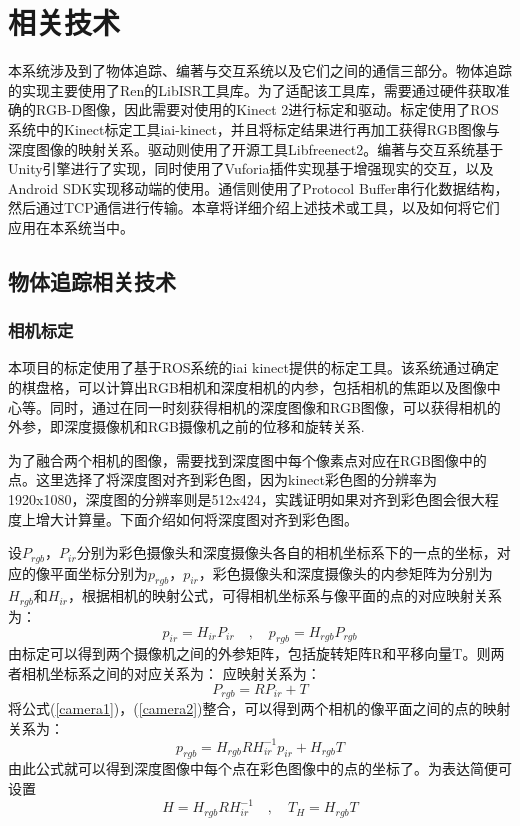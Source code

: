 \chapter{相关技术}
\label{chap:tech}

本系统涉及到了物体追踪、编著与交互系统以及它们之间的通信三部分。物体追踪的实现主要使用了Ren的LibISR工具库\cite{Ren_3DV_2014,star3d_iccv_2013}。为了适配该工具库，需要通过硬件获取准确的RGB-D图像，因此需要对使用的Kinect 2进行标定和驱动。标定使用了ROS系统中的Kinect标定工具iai-kinect\cite{iai_kinect2}，并且将标定结果进行再加工获得RGB图像与深度图像的映射关系。驱动则使用了开源工具Libfreenect2\cite{libfreenect2}。编著与交互系统基于Unity引擎\cite{Unity}进行了实现，同时使用了Vuforia插件\cite{Vuforia}实现基于增强现实的交互，以及Android SDK\cite{Android}实现移动端的使用。通信则使用了Protocol Buffer\cite{Protobuf, ProtobufNet}串行化数据结构，然后通过TCP通信进行传输。本章将详细介绍上述技术或工具，以及如何将它们应用在本系统当中。

\section{物体追踪相关技术}
\subsection{相机标定}
本项目的标定使用了基于ROS系统的iai kinect提供的标定工具。该系统通过确定的棋盘格，可以计算出RGB相机和深度相机的内参，包括相机的焦距以及图像中心等。同时，通过在同一时刻获得相机的深度图像和RGB图像，可以获得相机的外参，即深度摄像机和RGB摄像机之前的位移和旋转关系.

为了融合两个相机的图像，需要找到深度图中每个像素点对应在RGB图像中的点。这里选择了将深度图对齐到彩色图，因为kinect彩色图的分辨率为1920x1080，深度图的分辨率则是512x424，实践证明如果对齐到彩色图会很大程度上增大计算量。下面介绍如何将深度图对齐到彩色图。

设$P_{rgb}$，$P_{ir}$分别为彩色摄像头和深度摄像头各自的相机坐标系下的一点的坐标，对应的像平面坐标分别为$p_{rgb}$，$p_{ir}$，彩色摄像头和深度摄像头的内参矩阵为分别为$H_{rgb}$和$H_{ir}$，根据相机的映射公式，可得相机坐标系与像平面的点的对应映射关系为：
\begin{equation}
 p_{ir} = H_{ir}P_{ir} \quad\mathrm{,}\quad  p_{rgb} = H_{rgb}P_{rgb}\label{camera1}
\end{equation}
由标定可以得到两个摄像机之间的外参矩阵，包括旋转矩阵R和平移向量T。则两者相机坐标系之间的对应关系为：
应映射关系为：
\begin{equation}
 P_{rgb} = RP_{ir} + T \label{camera2}
\end{equation}
将公式(\ref{camera1})，(\ref{camera2})整合，可以得到两个相机的像平面之间的点的映射关系为：
\begin{equation}
 p_{rgb} = H_{rgb}RH_{ir}^{-1}p_{ir} + H_{rgb}T
\end{equation}
由此公式就可以得到深度图像中每个点在彩色图像中的点的坐标了。为表达简便可设置
\begin{equation}
 H = H_{rgb}RH_{ir}^{-1} \quad\mathrm{,}\quad T_H = H_{rgb}T
\end{equation}


